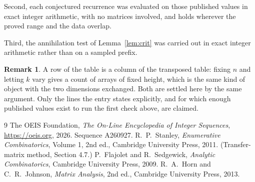 \documentclass[11pt,a4paper]{article}
\theoremstyle{plain}
\theoremstyle{definition}
\newtheorem{remark}[theorem]{Remark}
\begin{document}
Second, each conjectured recurrence was evaluated on those published values in exact
integer arithmetic, with no matrices involved, and holds wherever the proved range and the
data overlap.

Third, the annihilation test of Lemma~\ref{lem:crit} was carried out in exact integer
arithmetic rather than on a sampled prefix.

\begin{remark}
A row of the table is a column of the transposed table: fixing $n$ and letting $k$ vary gives a
count of arrays of fixed height, which is the same kind of object with the two dimensions
exchanged. Both are settled here by the same argument. Only the lines the entry states
explicitly, and for which enough published values exist to run the first check above, are
claimed.
\end{remark}

\begin{thebibliography}{9}
 The OEIS Foundation, \emph{The On-Line Encyclopedia of Integer
Sequences}, \url{https://oeis.org}, 2026. Sequence A260927.
 R.~P.~Stanley, \emph{Enumerative Combinatorics}, Volume 1, 2nd ed.,
Cambridge University Press, 2011. (Transfer-matrix method, Section 4.7.)
 P.~Flajolet and R.~Sedgewick, \emph{Analytic Combinatorics}, Cambridge
University Press, 2009.
 R.~A.~Horn and C.~R.~Johnson, \emph{Matrix Analysis}, 2nd ed., Cambridge
University Press, 2013.
\end{thebibliography}
\end{document}
